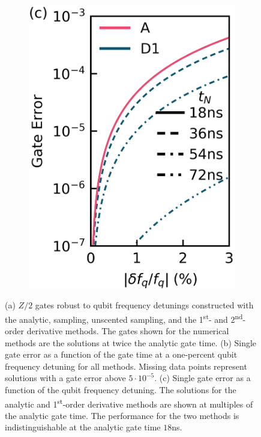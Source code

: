 \begin{figure}[ht]
\begin{subfigure}{.4\textwidth}
    \caption{\label{fig:staticb}}
  \end{subfigure}\hfill
  \begin{subfigure}{.23\textwidth}
    \includegraphics[width=\linewidth]{assets/f2c.png}
    \caption{\label{fig:staticc}}
  \end{subfigure}
  \caption{
    (a) $Z/2$ gates robust to qubit frequency detunings constructed with the
    analytic, sampling, unscented sampling, and the 1\textsuperscript{st}-
    and 2\textsuperscript{nd}-order derivative methods. The gates
    shown for the numerical methods are the solutions at twice the analytic
    gate time.
    (b) Single gate error as
    a function of the gate time at a one-percent
    qubit frequency detuning for all methods. Missing
    data points represent solutions with a gate error above $5 \cdot 10^{-5}$.
    (c) Single gate error as a function of the qubit frequency detuning.
    The solutions for the analytic and
    1\textsuperscript{st}-order derivative methods are shown at multiples
    of the analytic gate time. The performance for the two methods is
    indistinguishable at the analytic gate time $18$ns.
  }
  \label{fig:static}
\end{figure}

